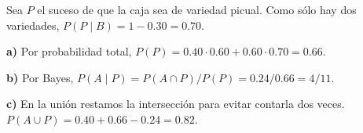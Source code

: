 Sea $P$ el suceso de que la caja sea de variedad picual.
Como sólo hay dos variedades, $P(P\mid B)=1-0.30=0.70$.


\textbf{a)} Por probabilidad total, $P(P)=0.40\cdot0.60+0.60\cdot0.70
=\boxed{0.66}$.

\textbf{b)} Por Bayes, $P(A\mid P)=P(A\cap P)/P(P)=0.24/0.66
=\boxed{4/11}$.

\textbf{c)} En la unión restamos la intersección para evitar contarla
dos veces. $P(A\cup P)=0.40+0.66-0.24=\boxed{0.82}$.
